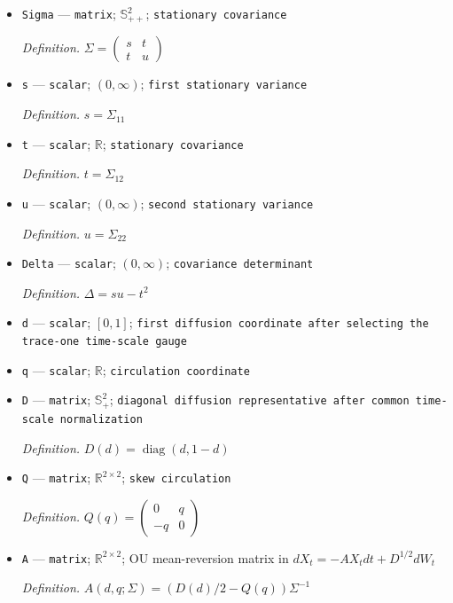 \documentclass{article}
\begin{document}
\begin{itemize}
  \item \texttt{Sigma} --- \texttt{matrix}; \(\mathbb S_{++}^{2}\); \texttt{stationary covariance}
  \par\smallskip\noindent\emph{Definition.} \(\Sigma=\begin{pmatrix}s&t\\t&u\end{pmatrix}\)
  \item \texttt{s} --- \texttt{scalar}; \((0,\infty)\); \texttt{first stationary variance}
  \par\smallskip\noindent\emph{Definition.} \(s=\Sigma_{11}\)
  \item \texttt{t} --- \texttt{scalar}; \(\mathbb R\); \texttt{stationary covariance}
  \par\smallskip\noindent\emph{Definition.} \(t=\Sigma_{12}\)
  \item \texttt{u} --- \texttt{scalar}; \((0,\infty)\); \texttt{second stationary variance}
  \par\smallskip\noindent\emph{Definition.} \(u=\Sigma_{22}\)
  \item \texttt{Delta} --- \texttt{scalar}; \((0,\infty)\); \texttt{covariance determinant}
  \par\smallskip\noindent\emph{Definition.} \(\Delta=su-t^2\)
  \item \texttt{d} --- \texttt{scalar}; \([0,1]\); \texttt{first diffusion coordinate after selecting the trace-\allowbreak{}one time-\allowbreak{}scale gauge}
  \item \texttt{q} --- \texttt{scalar}; \(\mathbb R\); \texttt{circulation coordinate}
  \item \texttt{D} --- \texttt{matrix}; \(\mathbb S_{+}^{2}\); \texttt{diagonal diffusion representative after common time-\allowbreak{}scale normalization}
  \par\smallskip\noindent\emph{Definition.} \(D(d)=\operatorname{diag}(d,1-d)\)
  \item \texttt{Q} --- \texttt{matrix}; \(\mathbb R^{2\times2}\); \texttt{skew circulation}
  \par\smallskip\noindent\emph{Definition.} \(Q(q)=\begin{pmatrix}0&q\\-q&0\end{pmatrix}\)
  \item \texttt{A} --- \texttt{matrix}; \(\mathbb R^{2\times2}\); OU mean-reversion matrix in \(dX_t=-AX_tdt+D^{1/2}dW_t\)
  \par\smallskip\noindent\emph{Definition.} \(A(d,q;\Sigma)=(D(d)/2-Q(q))\Sigma^{-1}\)

\end{itemize}
\end{document}
